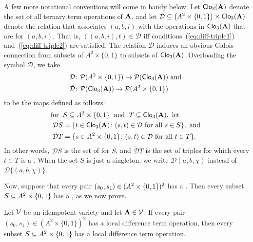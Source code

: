 
\newcommand\dtrel{\ensuremath{\mathrel{\mathcal{D}}}}
\newcommand\dtr{\ensuremath{\mathcal{D}}}
A few more notational conventions will come in handy below.
Let $\operatorname{\mathsf{Clo}}_3(\mathbf{A})$ denote the set of all ternary term operations of $\mathbf{A}$,
and let 
$\dtr \subseteq \bigl(A^2\times \{0,1\}\bigr) \times \Clo_3(\alg{A})$
denote the relation that associates $(a, b, i)$
with the operations in $\operatorname{\mathsf{Clo}}_3(\mathbf{A})$ that are \ldtos for
$(a, b, i)$.  That is,
$((a,b,i), t) \in \dtr$ iff conditions~(\ref{eq:diff-triple1}) 
and~(\ref{eq:diff-triple2}) are satisfied.
The relation $\dtr$ induces an obvious Galois connection
from subsets of $A^2\times \{0,1\}$ to subsets
of $\operatorname{\mathsf{Clo}}_3(\mathbf{A})$.  Overloading the symbol $\dtr$, 
we take
\begin{align*}
\dtr &\colon \sP(A^2 \times \{0,1\}) \to \sP(\Clo_3(\alg{A})) \text{ and }\\
\breve{\dtr} &\colon \sP(\Clo_3(\alg{A})) \to \sP(A^2\times \{0,1\})
\end{align*}
to be the maps defined as follows:
\begin{align*}
  \text{for }\;  & S \subseteq A^2 \times \{0,1\}\; \text{ and } \;T \subseteq \Clo_3(\alg{A}),
  \text{ let }\\
  \dtr S &= \{t \in \Clo_3(\alg{A}) \colon (s,t) \in \dtr \text{ for all } s \in S\}, \text{ and }\\
  \breve{\dtr} T &= \{s \in A^2 \times \{0,1\} \colon (s,t) \in \dtr \text{ for all } t \in T\}.
\end{align*}
In other words, $\dtr S$ is the set of \ldtos
for $S$, and $\breve{\dtr} T$ is the set of triples for which every $t\in T$
is a \ldto.  When the set $S$ is just a singleton, we write 
$\dtr (a,b,\chi)$ instead of $\dtr \{(a,b,\chi)\}$.

Now, suppose that every pair
$(s_0, s_1)\in (A^2 \times \{0,1\})^2$ %
has a \ldto.
Then every subset $S\subseteq A^2 \times \{0,1\}$
has a \ldto, as we now prove.

\begin{theorem} %
  \label{thm:local-diff-terms}
  Let $\mathcal{V}$ be an idempotent variety and let
  $\mathbf{A}  \in \mathcal{V}$. %
  If every pair
  $(s_0, s_1) \in (A^2 \times \{0,1\})^2$
  has a local difference term operation, then
  every subset $S \subseteq A^2 \times \{0,1\}$
  has a local difference term operation.
\end{theorem}



